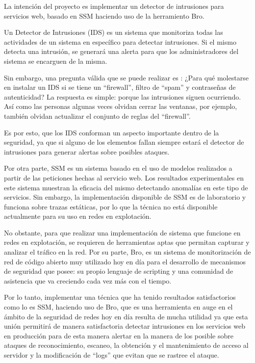 La intención del proyecto es implementar un detector de intrusiones para servicios web, basado en SSM haciendo uso de la herramiento Bro.

Un Detector de Intrusiones (IDS) es un sistema que monitoriza todas las actividades de un sistema en específico para detectar intrusiones\cite{IDSdef}. Si el mismo detecta una intrusión, se generará una alerta para que los administradores del sistema se encarguen de la misma.

Sin embargo, una pregunta válida que se puede realizar es : ¿Para qué molestarse en instalar un IDS si se tiene un ``firewall'', filtro de ``spam'' y contraseñas de autenticidad? La respuesta es simple: porque las intrusiones siguen ocurriendo. Así como las personas algunas veces olvidan cerrar las ventanas, por ejemplo, también olvidan actualizar el conjunto de reglas del ``firewall''. \cite{IDSimportance}

Es por esto, que los IDS conforman un aspecto importante dentro de la seguridad, ya que si alguno de los elementos fallan siempre estará el detector de intrusiones para generar alertas sobre posibles ataques.

Por otra parte, SSM es un sistema basado en el uso de modelos realizados a partir de las peticiones hechas al servicio web. Los resultados experimentales en este sistema muestran la eficacia del mismo detectando anomalías en este tipo de servicios. Sin embargo, la implementación disponible de SSM es de laboratorio y funciona sobre trazas estáticas, por lo que la técnica no está disponible actualmente para su uso en redes en explotación.

No obstante, para que realizar una implementación de sistema que funcione en redes en explotación, se requieren de herramientas aptas que permitan capturar y analizar el tráfico en la red. Por su parte, Bro, es un sistema de monitorización de red de código abierto muy utilizado hoy en día para el desarrollo de mecanismos de seguridad que posee: su propio lenguaje de scripting y una comunidad de asistencia que va creciendo cada vez más con el tiempo.

Por lo tanto, implementar una técnica que ha tenido resultados satisfactorios como lo es SSM, haciendo uso de Bro, que es una herramienta en auge en el ámbito de la seguridad de redes hoy en día resulta de mucha utilidad ya que esta unión permitirá de manera satisfactoria detectar intrusiones en los servicios web en producción para de esta manera alertar en la manera de los posible sobre ataques de reconocimiento, escaneo, la obtención y el mantenimiento de acceso al servidor y la modificación de ``logs'' que evitan que se rastree el ataque.


